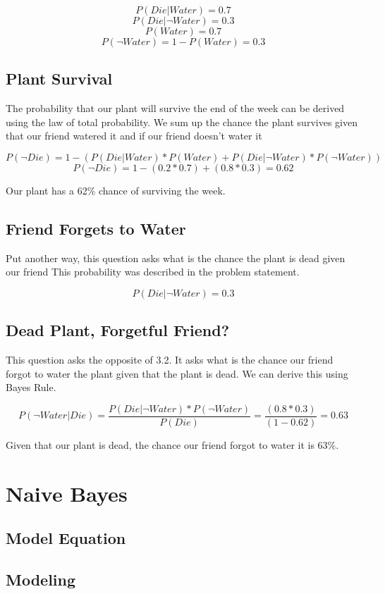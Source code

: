 \documentclass{article}
\begin{document}
\[P(Die | Water) = 0.7\]
\[P(Die | \neg Water) = 0.3\]
\[P(Water) = 0.7\]
\[P(\neg Water) = 1 - P(Water) = 0.3\]

\subsection{Plant Survival}
The probability that our plant will survive the end of the week can be derived using the law of total probability. We sum up the chance the plant survives given that our friend watered it and if our friend doesn't water it

\[P(\neg Die) = 1 - ( P(Die | Water) * P(Water) + P(Die | \neg Water) * P(\neg Water) ) \]
\[P(\neg Die) = 1 - (0.2*0.7) + (0.8*0.3) = 0.62 \]

\vspace{10mm}
\noindent
Our plant has a 62\% chance of surviving the week.

\subsection{Friend Forgets to Water}
Put another way, this question asks what is the chance the plant is dead given our friend  This probability was described in the problem statement.

\[P(Die | \neg Water) = 0.3\]

\subsection{Dead Plant, Forgetful Friend?}
This question asks the opposite of 3.2. It asks what is the chance our friend forgot to water the plant given that the plant is dead. We can derive this using Bayes Rule.

\[P(\neg Water | Die) = \frac{P(Die | \neg Water) * P(\neg Water)}{P(Die)} = \frac{(0.8*0.3)}{(1-0.62)} = 0.63\]

Given that our plant is dead, the chance our friend forgot to water it is 63\%.

\section{Naive Bayes}

\subsection{Model Equation}
\subsection{Modeling}
\end{document}
